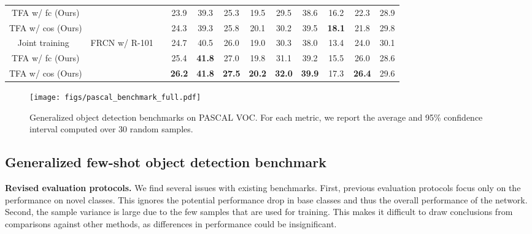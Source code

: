 \documentclass{article}
\newcommand{\model}{TFA\xspace}
\newcommand\minisection[1]{\vspace{1mm}\noindent \textbf{#1}}
\begin{document}
\begin{table*}[t]
{\begin{tabular}{c|c|c|ccc|ccc|ccc}
			\model w/ fc (Ours) &  & & 23.9 & 39.3 & 25.3 & 19.5 & 29.5 & 38.6 & 16.2 & 22.3 & 28.9  \\
			\model w/ cos (Ours) &  & & \cellcolor{Gray} 24.3 & \cellcolor{Gray} 39.3 & \cellcolor{Gray} 25.8 & \cellcolor{Gray} 20.1 & \cellcolor{Gray} 30.2 & \cellcolor{Gray} 39.5 & \cellcolor{Gray} \textbf{18.1} & \cellcolor{Gray} 21.8 & \cellcolor{Gray} 29.8
  \\\midrule
			Joint training~\cite{gupta2019lvis} & \multirow{3}{*}{FRCN w/ R-101}  & \multirow{3}{*}{\checkmark} & 24.7 & 40.5 & 26.0 & 19.0 & 30.3 & 38.0 & 13.4 & 24.0 & 30.1 \\ 
			\model w/ fc (Ours) &  & & 25.4 & \textbf{41.8} & 27.0 & 19.8 & 31.1 & 39.2 & 15.5 & 26.0 & 28.6 \\
			\model w/ cos (Ours) & & & \cellcolor{Gray} \textbf{26.2} & \cellcolor{Gray}\textbf{41.8} & \cellcolor{Gray}\textbf{27.5} & \cellcolor{Gray}\textbf{20.2} & \cellcolor{Gray}\textbf{32.0} & \cellcolor{Gray}\textbf{39.9} & \cellcolor{Gray}17.3 & \cellcolor{Gray}\textbf{26.4} & \cellcolor{Gray}29.6 \\ 
			\bottomrule
	\end{tabular}}
	\label{tab:lvis_bench}
\end{table*}




\begin{figure*}[ht]
	\begin{center}
		\centerline{\texttt{[image: figs/pascal\_benchmark\_full.pdf]}}
		\vspace{-5mm}
		\caption{Generalized object detection benchmarks on PASCAL VOC. For each metric, we report the average and 95\% confidence interval computed over 30 random samples.}
		\label{fig:voc_bench}
	\end{center}
	\vspace{-10mm}
\end{figure*}

\subsection{Generalized few-shot object detection benchmark}
\label{sec:revised_bench}
\minisection{Revised evaluation protocols.}
We find several issues with existing benchmarks.
First, previous evaluation protocols focus only on the performance on novel classes.
This ignores the potential performance drop in base classes and thus the overall performance of the network.
Second, the sample variance is large due to the few samples that are used for training.
This makes it difficult to draw conclusions from comparisons against other methods, as differences in performance could be insignificant.
\end{document}
